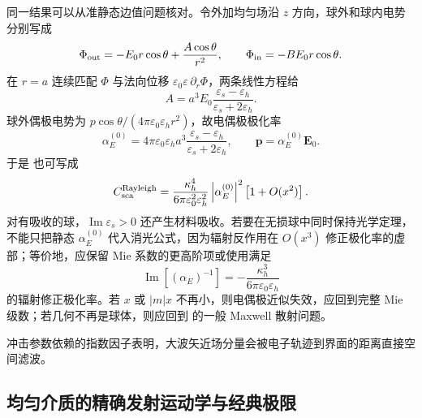 \begin{exbox}
同一结果可以从准静态边值问题核对。令外加均匀场沿 $z$ 方向，球外和球内电势分别写成
\begin{equation*}
\Phi_{\rm out}
=-E_0r\cos\theta+\frac{A\cos\theta}{r^2},
\qquad
\Phi_{\rm in}=-BE_0r\cos\theta.
\end{equation*}
在 $r=a$ 连续匹配 $\Phi$ 与法向位移 $\varepsilon_0\varepsilon\,\partial_r\Phi$，两条线性方程给
\begin{equation*}
A=a^3E_0
\frac{\varepsilon_s-\varepsilon_h}
{\varepsilon_s+2\varepsilon_h}.
\end{equation*}
球外偶极电势为 $p\cos\theta/(4\pi\varepsilon_0\varepsilon_h r^2)$，故电偶极极化率
\begin{equation}
\boxed{
\alpha_E^{(0)}
=4\pi\varepsilon_0\varepsilon_h a^3
\frac{\varepsilon_s-\varepsilon_h}
{\varepsilon_s+2\varepsilon_h},
\qquad
\mathbf p=\alpha_E^{(0)}\mathbf E_0.}
\label{eq:rayleigh-static-polarizability-dp75}
\end{equation}
于是 也可写成
\begin{equation*}
C_{\rm sca}^{\rm Rayleigh}
=\frac{\kappa_h^4}
{6\pi\varepsilon_0^2\varepsilon_h^2}
\left|\alpha_E^{(0)}\right|^2
\left[1+O(x^2)\right].
\end{equation*}
对有吸收的球，$\operatorname{Im}\varepsilon_s>0$ 还产生材料吸收。若要在无损球中同时保持光学定理，不能只把静态 $\alpha_E^{(0)}$ 代入消光公式，因为辐射反作用在 $O(x^3)$ 修正极化率的虚部；等价地，应保留 Mie 系数的更高阶项或使用满足
\begin{equation*}
\operatorname{Im}\!\left[(\alpha_E)^{-1}\right]
=-\frac{\kappa_h^3}{6\pi\varepsilon_0\varepsilon_h}
\end{equation*}
的辐射修正极化率。若 $x$ 或 $|m|x$ 不再小，则电偶极近似失效，应回到完整 Mie 级数；若几何不再是球体，则应回到 的一般 Maxwell 散射问题。
\end{exbox}

冲击参数依赖的指数因子表明，大波矢近场分量会被电子轨迹到界面的距离直接空间滤波。

\subsection{均匀介质的精确发射运动学与经典极限}

